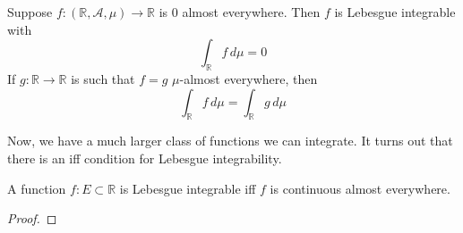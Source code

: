   \begin{theorem}
    Suppose $f: (\mathbb{R}, \mathcal{A}, \mu) \longrightarrow \mathbb{R}$ is $0$ almost everywhere. Then $f$ is Lebesgue integrable with 
    \begin{equation}
      \int_\mathbb{R} f \, d\mu = 0 
    \end{equation}
    If $g: \mathbb{R} \longrightarrow \mathbb{R}$ is such that $f = g$ $\mu$-almost everywhere, then
    \begin{equation}
      \int_\mathbb{R} f\, d\mu = \int_\mathbb{R} g \, d\mu
    \end{equation}
  \end{theorem}

  Now, we have a much larger class of functions we can integrate. It turns out that there is an iff condition for Lebesgue integrability. 

  \begin{theorem}
    A function $f: E \subset \mathbb{R}$ is Lebesgue integrable iff $f$ is continuous almost everywhere. 
  \end{theorem}
  \begin{proof}
    
  \end{proof} 

